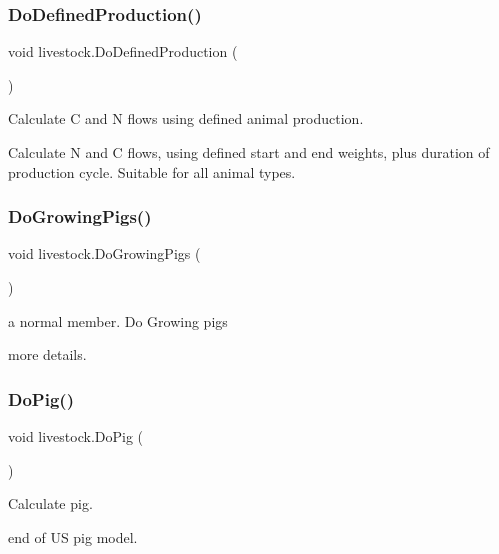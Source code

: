 \subsubsection{\texorpdfstring{DoDefinedProduction()}{DoDefinedProduction()}}
{\footnotesize\ttfamily void livestock.\+Do\+Defined\+Production (\begin{DoxyParamCaption}{ }\end{DoxyParamCaption})\hspace{0.3cm}{\ttfamily [inline]}}



Calculate C and N flows using defined animal production. 

Calculate N and C flows, using defined start and end weights, plus duration of production cycle. Suitable for all animal types. \mbox{\label{classlivestock_aeff04ec4200c0e18934cf3d0084fb187}} 
\subsubsection{\texorpdfstring{DoGrowingPigs()}{DoGrowingPigs()}}
{\footnotesize\ttfamily void livestock.\+Do\+Growing\+Pigs (\begin{DoxyParamCaption}{ }\end{DoxyParamCaption})\hspace{0.3cm}{\ttfamily [inline]}}



a normal member. Do Growing pigs 

more details. \mbox{\label{classlivestock_a4d2339d509e3977e72d2299f6b13a6c1}} 
\subsubsection{\texorpdfstring{DoPig()}{DoPig()}}
{\footnotesize\ttfamily void livestock.\+Do\+Pig (\begin{DoxyParamCaption}{ }\end{DoxyParamCaption})\hspace{0.3cm}{\ttfamily [inline]}}



Calculate pig. 

end of US pig model. \mbox{\label{classlivestock_aae915d09f0a2e9cb020a6fb59335437a}} 
